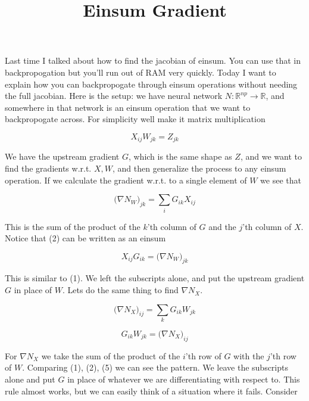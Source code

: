 \documentclass[11pt]{article}
\title{Einsum Gradient}
\begin{document}
\maketitle
Last time I talked about
how to find the jacobian of einsum. You can use that in backpropogation
but you'll run out of RAM very quickly. 
Today I want to explain how you can backpropogate through einsum operations 
without needing the full jacobian. Here is the setup: we have neural
network 
$N : \mathbb{R}^{np} \rightarrow \mathbb{R}$, and somewhere in that network
is an einsum operation that we want to backpropogate across.
For simplicity well make it matrix multiplication

\begin{equation}
    X_{ij}W_{jk} = Z_{jk}
\end{equation}

We have the upstream gradient $G$, 
which is the same shape as $Z$,
and we want to find the gradients w.r.t. $X, W$,
and then generalize the process to any einsum operation. 
If we calculate the
gradient w.r.t. to a single element of $W$ we see that

\begin{equation}
    \bigl(\nabla N_{W}\bigr)_{jk} = \sum_i G_{ik}X_{ij}
\end{equation}

This is the sum of the product of the $k$'th column of $G$ and the $j$'th column
of $X$. Notice that (2) can be written as an einsum

\begin{equation}
    X_{ij}G_{ik} = \bigl(\nabla N_{W} \bigr)_{jk}
\end{equation}

This is similar to (1). We left the subscripts alone, and put the upstream gradient $G$ 
in place of $W$. Lets do the same thing to find $\nabla N_X$.

\begin{equation}
    \bigl(\nabla N_{X}\bigr)_{ij} = \sum_k G_{ik}W_{jk}
\end{equation}

\begin{equation}
    G_{ik}W_{jk} = \bigl(\nabla N_{X} \bigr)_{ij}
\end{equation}

For $\nabla N_X$ we take the sum of the product of the $i$'th row of $G$ with the $j$'th row 
of $W$. Comparing (1), (2), (5) we can see the pattern. 
We leave the subscripts alone and put $G$ in place of whatever we are 
differentiating with respect to. 
This rule almost works, but we can easily think of a situation where it fails. Consider
\end{document}
